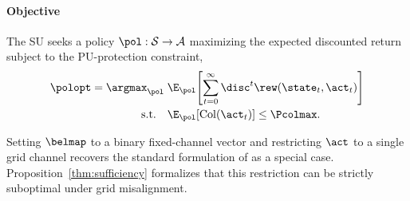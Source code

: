 \paragraph*{Objective} The SU seeks a policy
$\pol:\mathcal{S}\to\mathcal{A}$ maximizing the expected discounted return
subject to the PU-protection constraint,
\begin{equation}
\begin{aligned}
\polopt = \argmax_{\pol}\;
&\E_{\pol}\!\left[\sum_{t=0}^{\infty}\disc^{t}
\rew(\state_t,\act_t)\right]\\[-1pt]
\text{s.t.}\quad
&\E_{\pol}\!\left[\mathrm{Col}(\act_t)\right] \le \Pcolmax .
\end{aligned}
\label{eq:objective}
\end{equation}

\begin{remark}
Setting $\belmap$ to a binary fixed-channel vector and restricting $\act$ to
a single grid channel recovers the standard formulation of
\cite{wang2018,zhong2019} as a special case. Proposition~\ref{thm:sufficiency}
formalizes that this restriction can be strictly suboptimal under grid misalignment.
\end{remark}
